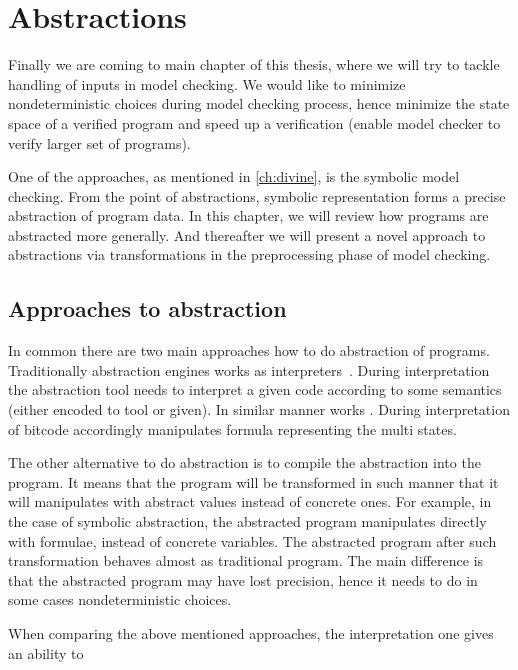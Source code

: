 \chapter{Abstractions}\label{ch:abstraction}

Finally we are coming to main chapter of this thesis, where we will try to tackle
handling of inputs in model checking. We would like to minimize nondeterministic
choices during model checking process, hence minimize the state space of a
verified program and speed up a verification (enable model checker to verify
larger set of programs).

One of the approaches, as mentioned in \autoref{ch:divine}, is the symbolic model checking.
From the point of abstractions, symbolic representation forms a precise abstraction
of program data. In this chapter, we will review how programs are abstracted more generally.
And thereafter we will present a novel approach to abstractions via transformations
in the preprocessing phase of model checking.

\section{Approaches to abstraction}

In common there are two main approaches how to do abstraction of programs.
Traditionally abstraction engines works as interpreters~\cite{Cousot79}. During
interpretation the abstraction tool needs to interpret a given code according
to some semantics (either encoded to tool or given). In similar manner works
\SymDIVINE.  During interpretation of \LLVM bitcode \SymDIVINE accordingly
manipulates formula representing the multi states.

The other alternative to do abstraction is to compile the abstraction into the
program. It means that the program will be transformed in such manner that it will
manipulates with abstract values instead of concrete ones. For example, in the
case of symbolic abstraction, the abstracted program manipulates directly with
formulae, instead of concrete variables. The abstracted program after such
transformation behaves almost as traditional program. The main difference is
that the abstracted program may have lost precision, hence it needs to do
in some cases nondeterministic choices.

When comparing the above mentioned approaches, the interpretation one gives an
ability to


